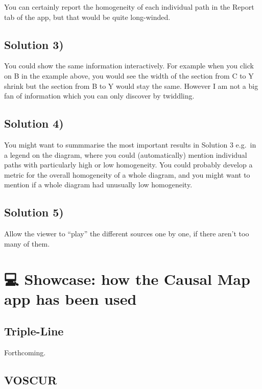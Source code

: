\documentclass[
]{book}
\begin{document}
You can certainly report the homogeneity of each individual path in the Report tab of the app, but that would be quite long-winded.

\hypertarget{solution-3}{%
\section{Solution 3)}\label{solution-3}}

You could show the same information interactively. For example when you click on B in the example above, you would see the width of the section from C to Y shrink but the section from B to Y would stay the same. However I am not a big fan of information which you can only discover by twiddling.

\hypertarget{solution-4}{%
\section{Solution 4)}\label{solution-4}}

You might want to summmarise the most important results in Solution 3 e.g.~in a legend on the diagram, where you could (automatically) mention individual paths with particularly high or low homogeneity. You could probably develop a metric for the overall homogeneity of a whole diagram, and you might want to mention if a whole diagram had unusually low homogeneity.

\hypertarget{solution-5}{%
\section{Solution 5)}\label{solution-5}}

Allow the viewer to ``play'' the different sources one by one, if there aren't too many of them.

\hypertarget{showcase}{%
\chapter{💻 Showcase: how the Causal Map app has been used}\label{showcase}}

\hypertarget{triple-line}{%
\section{Triple-Line}\label{triple-line}}

Forthcoming.

\hypertarget{voscur}{%
\section{VOSCUR}\label{voscur}}
\end{document}
